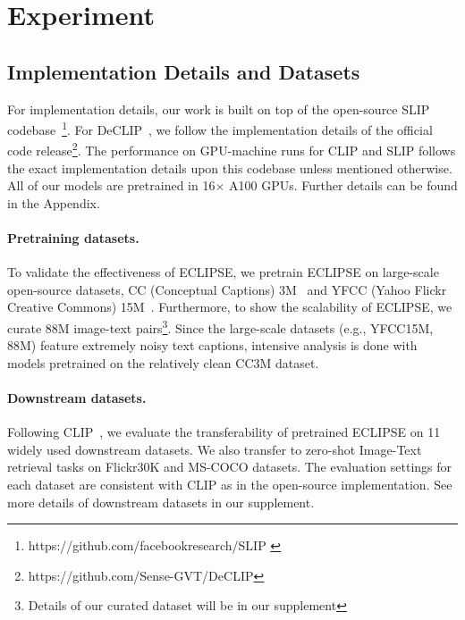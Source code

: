 \section{Experiment}
\subsection{Implementation Details and Datasets}
For implementation details, our work is built on top of the open-source SLIP codebase~\cite{mu2021slip}\footnote{https://github.com/facebookresearch/SLIP \label{slip_github}}.
For DeCLIP~\cite{li2022supervision}, we follow the implementation details of the official code release\footnote{https://github.com/Sense-GVT/DeCLIP}.
The performance on GPU-machine runs for CLIP and SLIP follows the exact implementation details upon this codebase unless mentioned otherwise.
All of our models are pretrained in 16$\times$ A100 GPUs.
Further details can be found in the Appendix.

\paragraph{Pretraining datasets.}
To validate the effectiveness of ECLIPSE, we pretrain ECLIPSE on large-scale open-source datasets, CC (Conceptual Captions) 3M~\cite{sharma2018cc3m} and YFCC (Yahoo Flickr Creative Commons) 15M~\cite{Thomee2016YFCC100M}.
Furthermore, to show the scalability of ECLIPSE, we curate 88M image-text pairs\footnote{Details of our curated dataset will be in our supplement}.
Since the large-scale datasets (e.g., YFCC15M, 88M) feature extremely noisy text captions, intensive analysis is done with models pretrained on the relatively clean CC3M dataset.

\paragraph{Downstream datasets.}
Following CLIP~\cite{radford2021learning}, we evaluate the transferability of pretrained ECLIPSE on 11 widely used downstream datasets.
We also transfer to zero-shot Image-Text retrieval tasks on Flickr30K and MS-COCO datasets.
The evaluation settings for each dataset are consistent with CLIP as in the open-source implementation.
See more details of downstream datasets in our supplement.

